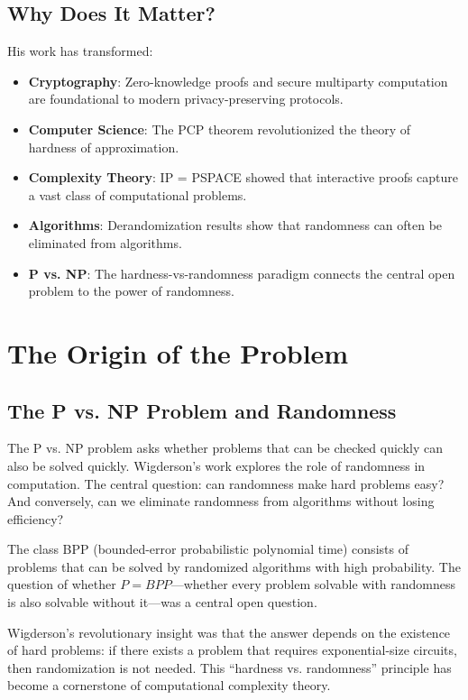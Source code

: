 \subsection{Why Does It Matter?}

His work has transformed:
\begin{itemize}
\item \textbf{Cryptography}: Zero-knowledge proofs and secure multiparty computation are foundational to modern privacy-preserving protocols.
\item \textbf{Computer Science}: The PCP theorem revolutionized the theory of hardness of approximation.
\item \textbf{Complexity Theory}: IP = PSPACE showed that interactive proofs capture a vast class of computational problems.
\item \textbf{Algorithms}: Derandomization results show that randomness can often be eliminated from algorithms.
\item \textbf{P vs. NP}: The hardness-vs-randomness paradigm connects the central open problem to the power of randomness.
\end{itemize}

\section{The Origin of the Problem}

\subsection{The P vs. NP Problem and Randomness}

The P vs. NP problem asks whether problems that can be checked quickly can also be solved quickly. Wigderson's work explores the role of randomness in computation. The central question: can randomness make hard problems easy? And conversely, can we eliminate randomness from algorithms without losing efficiency?

The class BPP (bounded-error probabilistic polynomial time) consists of problems that can be solved by randomized algorithms with high probability. The question of whether $P = BPP$---whether every problem solvable with randomness is also solvable without it---was a central open question.

Wigderson's revolutionary insight was that the answer depends on the existence of hard problems: if there exists a problem that requires exponential-size circuits, then randomization is not needed. This ``hardness vs. randomness'' principle has become a cornerstone of computational complexity theory.

